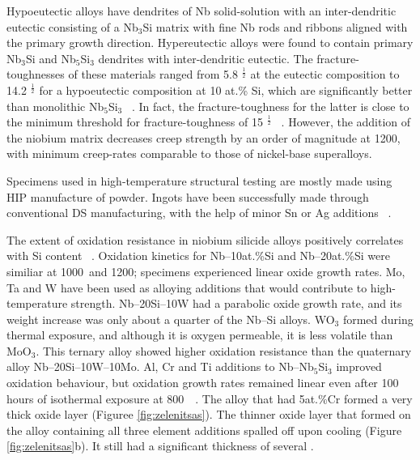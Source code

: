 Hypoeutectic alloys have dendrites of Nb solid-solution with an inter-dendritic eutectic consisting of a Nb$_3$Si matrix with fine Nb rods and ribbons aligned with the primary growth direction.  Hypereutectic alloys were found to contain primary Nb$_3$Si and Nb$_5$Si$_3$ dendrites with inter-dendritic eutectic.  The fracture-toughnesses of these materials ranged from 5.8  \mega\pascal\usk\meter$^{\frac{1}{2}}$ at the eutectic composition to 14.2  \mega\pascal\usk\meter$^{\frac{1}{2}}$ for a hypoeutectic composition at 10 at.\% Si, which are significantly better than monolithic Nb$_5$Si$_3$ ~\cite{strum94}.  In fact, the fracture-toughness for the latter is close to the minimum threshold for fracture-toughness of 15 \mega\pascal\usk\meter$^{\frac{1}{2}}$ ~\cite{shah95}.  However, the addition of the niobium matrix decreases creep strength by an order of magnitude at 1200\celsius, with minimum creep-rates comparable to those of nickel-base superalloys.  

Specimens used in high-temperature structural testing are mostly made using HIP manufacture of powder.  Ingots have been successfully made through conventional DS manufacturing, with the help of minor Sn or Ag additions ~\cite{bewlay03, vellios10}.

The extent of oxidation resistance in niobium silicide alloys positively correlates with Si content ~\cite{xiong09}.  Oxidation kinetics for Nb--10at.\%Si and Nb--20at.\%Si were similiar at 1000\celsius\ and 1200\celsius; specimens experienced linear oxide growth rates.  Mo, Ta and W have been used as alloying additions that would contribute to high-temperature strength.  Nb--20Si--10W had a parabolic oxide growth rate, and its weight increase was only about a quarter of the Nb--Si alloys.  WO$_3$ formed during thermal exposure, and although it is oxygen permeable, it is less volatile than MoO$_3$.  This ternary alloy showed higher oxidation resistance than  the quaternary alloy Nb--20Si--10W--10Mo.  Al, Cr and Ti additions to Nb--Nb$_5$Si$_3$ improved oxidation behaviour, but oxidation growth rates remained linear even after 100 hours of isothermal exposure at 800\celsius\ ~\cite{zelenitsas06}.  The alloy that had 5at.\%Cr formed a very thick oxide layer (Figuree \ref{fig:zelenitsas}).  The thinner oxide layer that formed on the alloy containing all three element additions spalled off upon cooling (Figure \ref{fig:zelenitsas}b).  It still had a significant thickness of several \milli\metre.

